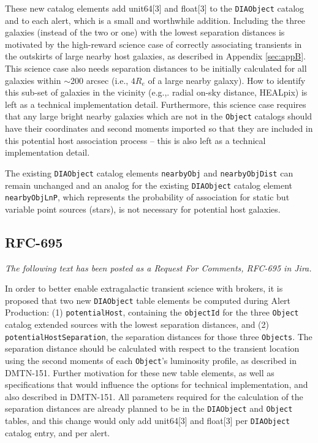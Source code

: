 \documentclass[DM,authoryear,toc]{lsstdoc}
\begin{document}
These new catalog elements add unit64[3] and float[3] to the {\tt DIAObject} catalog and to each alert, which is a small and worthwhile addition.
Including the three galaxies (instead of the two or one) with the lowest separation distances is motivated by the high-reward science case of correctly associating transients in the outskirts of large nearby host galaxies, as described in Appendix \ref{sec:appB}. 
This science case also needs separation distances to be initially calculated for all galaxies within $\sim$200 arcsec (i.e., $4R_e$ of a large nearby galaxy).
How to identify this sub-set of galaxies in the vicinity (e.g.,. radial on-sky distance, HEALpix) is left as a technical implementation detail.
Furthermore, this science case requires that any large bright nearby galaxies which are not in the {\tt Object} catalogs should have their coordinates and second moments imported so that they are included in this potential host association process -- this is also left as a technical implementation detail.

The existing {\tt DIAObject} catalog elements {\tt nearbyObj} and {\tt nearbyObjDist} can remain unchanged and an analog for the existing {\tt DIAObject} catalog element {\tt nearbyObjLnP}, which represents the probability of association for static but variable point sources (stars), is not necessary for potential host galaxies.


\subsection{RFC-695}\label{ssec:draft_rfc}

\textit{The following text has been posted as a Request For Comments, RFC-695 in Jira.}

In order to better enable extragalactic transient science with brokers, it is proposed that two new {\tt DIAObject} table elements be computed during Alert Production:
(1) {\tt potentialHost}, containing the {\tt objectId} for the three {\tt Object} catalog extended sources with the lowest separation distances, and
(2) {\tt potentialHostSeparation}, the separation distances for those three {\tt Objects}.
The separation distance should be calculated with respect to the transient location using the second moments of each {\tt Object}'s luminosity profile, as described in DMTN-151.
Further motivation for these new table elements, as well as specifications that would influence the options for technical implementation, and also described in DMTN-151.
All parameters required for the calculation of the separation distances are already planned to be in the {\tt DIAObject} and {\tt Object} tables, and this change would only add unit64[3] and float[3] per {\tt DIAObject} catalog entry, and per alert.
\end{document}
